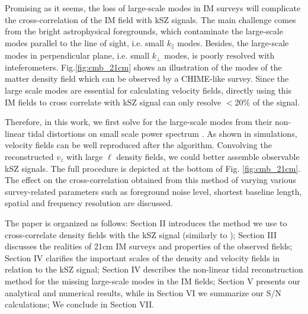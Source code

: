 Promising as it seems, the loss of large-scale modes in IM surveys will complicate the cross-correlation of the IM field with kSZ signals. The main challenge comes from the bright astrophysical foregrounds, which contaminate the large-scale modes parallel to the line of sight, i.e. small $k_\parallel$ modes. Besides, the large-scale modes in perpendicular plane, i.e. small $k_\perp$ modes, is poorly resolved with inteferometers. Fig.\ref{fig:cmb_21cm} shows an illustration of the modes of the matter density field which can be observed by a CHIME-like survey.
Since the large scale modes are essential 
for calculating velocity fields, 
directly using this IM fields to cross correlate with kSZ signal can only 
resolve $<20\%$ of the signal.  

Therefore, in this work, 
we first solve for the large-scale modes 
from their non-linear tidal distortions on small scale power spectrum \cite{2012:pen,2015:zhu}. 
As shown in simulations, velocity fields can be well reproduced 
after the algorithm. 
Convolving the reconstructed $v_z$ with large $\ell$ density fields, we could better assemble observable kSZ signals. 
The full procedure is depicted at the bottom of Fig. \ref{fig:cmb_21cm}. 
The effect on the cross-correlation obtained from this method of varying various survey-related parameters such as foreground noise level, shortest baseline length, spatial and frequency resolution are discussed.

The paper is organized as follows: Section II introduces the method we use to cross-correlate density fields with the kSZ signal (similarly to \cite{Shao11}); Section III discusses the realities of 21cm IM surveys and properties of the observed fields; Section IV clarifies the important scales of the density and velocity fields in relation to the kSZ signal; Section IV describes the non-linear tidal reconstruction method for the missing large-scale modes in the IM fields; Section V presents our analytical and numerical results, while in Section VI we summarize our S/N calculations; We conclude in Section VII.

